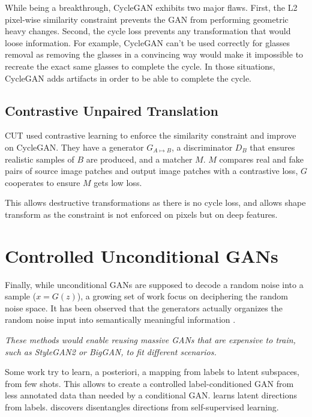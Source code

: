 While being a breakthrough, CycleGAN exhibits two major flaws. First, the L2 pixel-wise similarity constraint prevents the GAN from performing geometric heavy changes. Second, the cycle loss prevents any transformation that would loose information. For example, CycleGAN can't be used correctly for glasses removal as removing the glasses in a convincing way would make it impossible to recreate the exact same glasses to complete the cycle. In those situations, CycleGAN adds artifacts in order to be able to complete the cycle.

\subsection{Contrastive Unpaired Translation}

CUT \citep{cut} used contrastive learning to enforce the similarity constraint and improve on CycleGAN. They have a generator $G_{A \mapsto B}$, a discriminator $D_B$ that ensures realistic samples of $B$ are produced, and a matcher $M$. $M$ compares real and fake pairs of source image patches and output image patches with a contrastive loss, $G$ cooperates to ensure $M$ gets low loss.

This allows destructive transformations as there is no cycle loss, and allows shape transform as the constraint is not enforced on pixels but on deep features.

\section{Controlled Unconditional GANs}

Finally, while unconditional GANs are supposed to decode a random noise into a sample ($x=G(z)$), a growing set of work focus on deciphering the random noise space. It has been observed that the generators actually organizes the random noise input into semantically meaningful information \citep{bigan,bigbigan}.

\emph{These methods would enable reusing massive GANs that are expensive to train, such as StyleGAN2 or BigGAN, to fit different scenarios.}

Some work try to learn, a posteriori, a mapping from labels to latent subspaces, from few shots. This allows to create a controlled label-conditioned GAN from less annotated data than needed by a conditional GAN. \citet{interpretingz} learns latent directions from labels. \citet{ganspace} discovers disentangles directions from self-supervised learning.

